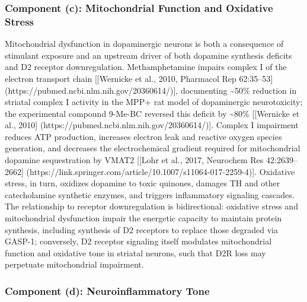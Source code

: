 \subsubsection{Component (c): Mitochondrial Function and Oxidative Stress}\label{18_restoration-component-c-mitochondrial-function-and-oxidative-stress}

Mitochondrial dysfunction in dopaminergic neurons is both a consequence of stimulant exposure and an upstream driver of both dopamine synthesis deficits and D2 receptor downregulation. Methamphetamine impairs complex I of the electron transport chain {[}{[}Wernicke et al., 2010, Pharmacol Rep 62:35--53{]} (https://pubmed.ncbi.nlm.nih.gov/20360614/){]}, documenting \textasciitilde50\% reduction in striatal complex I activity in the MPP+ rat model of dopaminergic neurotoxicity; the experimental compound 9-Me-BC reversed this deficit by \textasciitilde80\% {[}{[}Wernicke et al., 2010{]} (https://pubmed.ncbi.nlm.nih.gov/20360614/){]}. Complex I impairment reduces ATP production, increases electron leak and reactive oxygen species generation, and decreases the electrochemical gradient required for mitochondrial dopamine sequestration by VMAT2 {[}{[}Lohr et al., 2017, Neurochem Res 42:2639--2662{]} (https://link.springer.com/article/10.1007/s11064-017-2259-4){]}. Oxidative stress, in turn, oxidizes dopamine to toxic quinones, damages TH and other catecholamine synthetic enzymes, and triggers inflammatory signaling cascades. The relationship to receptor downregulation is bidirectional: oxidative stress and mitochondrial dysfunction impair the energetic capacity to maintain protein synthesis, including synthesis of D2 receptors to replace those degraded via GASP-1; conversely, D2 receptor signaling itself modulates mitochondrial function and oxidative tone in striatal neurons, such that D2R loss may perpetuate mitochondrial impairment.

\subsubsection{Component (d): Neuroinflammatory Tone}\label{18_restoration-component-d-neuroinflammatory-tone}

